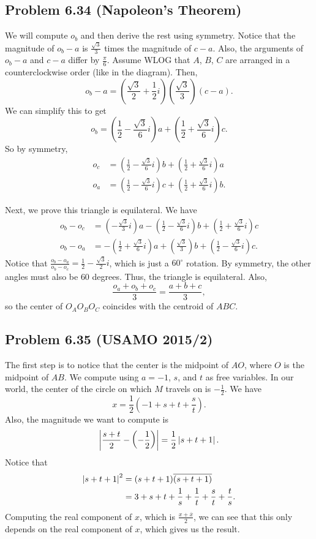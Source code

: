\documentclass{scrartcl}
\begin{document}
\subsection*{Problem 6.34 (Napoleon's Theorem)}

We will compute $o_b$ and then derive the rest using symmetry.
Notice that the magnitude of $o_b - a$ is $\frac{\sqrt{3}}{3}$ times the magnitude of $c - a$. Also, the arguments of $o_b - a$ and $c - a$ differ by $\frac{\pi}{6}$.
Assume WLOG that $A$, $B$, $C$ are arranged in a counterclockwise order (like in the diagram).
Then,
\[
    o_b - a = \left( \frac{\sqrt{3}}{2} + \frac{1}{2}i \right)\left( \frac{\sqrt{3}}{3} \right)(c - a).
\]
We can simplify this to get
\[
    o_b = \left( \frac{1}{2} - \frac{\sqrt{3}}{6}i \right)a + \left( \frac{1}{2} + \frac{\sqrt{3}}{6}i \right)c. 
\]
So by symmetry,
\begin{align*}
    o_c &= \left( \frac{1}{2} - \frac{\sqrt{3}}{6}i \right)b + \left( \frac{1}{2} + \frac{\sqrt{3}}{6}i \right)a \\
    o_a &= \left( \frac{1}{2} - \frac{\sqrt{3}}{6}i \right)c + \left( \frac{1}{2} + \frac{\sqrt{3}}{6}i \right)b.
\end{align*}

Next, we prove this triangle is equilateral. We have
\begin{align*}
    o_b - o_c &= \left( -\frac{\sqrt{3}}{3}i \right)a - \left( \frac{1}{2} - \frac{\sqrt{3}}{6}i \right)b + \left( \frac{1}{2} + \frac{\sqrt{3}}{6}i \right)c \\
    o_b - o_a &= -\left( \frac{1}{2} + \frac{\sqrt{3}}{6}i \right)a + \left( \frac{\sqrt{3}}{3} \right)b + \left( \frac12 - \frac{\sqrt{3}}{6}i \right)c.
\end{align*}
Notice that $\frac{o_b - o_a}{o_b - o_c} = \frac{1}{2} - \frac{\sqrt{3}}{2}i$, which is just a $60^\circ$ rotation. By symmetry, the other angles must also be $60$ degrees. Thus, the triangle is equilateral.
Also,
\[
    \frac{o_a + o_b + o_c}{3} = \frac{a + b + c}{3},
\]
so the center of $O_AO_BO_C$ coincides with the centroid of $ABC$.

\subsection*{Problem 6.35 (USAMO 2015/2)}
The first step is to notice that the center is the midpoint of $AO$, where $O$ is the midpoint of $AB$.
We compute using $a=-1$, $s$, and $t$ as free variables. In our world, the center of the circle on which $M$ travels on is $-\frac{1}{2}$.
We have
\[ x = \frac{1}{2} \left(-1 + s + t + \frac{s}{t}\right). \]
Also, the magnitude we want to compute is
\[ \left\lvert \frac{s+t}{2} - \left( - \frac{1}{2} \right) \right\rvert = \frac{1}{2} \left\lvert s + t + 1 \right\rvert. \]
Notice that
\begin{align*}
    \left\lvert s + t + 1 \right\rvert ^2 &= (s + t + 1)\overline{(s + t + 1)} \\
    &= 3 + s + t + \frac{1}{s} + \frac{1}{t} + \frac{s}{t} + \frac{t}{s}.
\end{align*}
Computing the real component of $x$, which is $\frac{x + \overline{x}}{2}$, we can see that this only depends on the real
component of $x$, which gives us the result.
\end{document}
